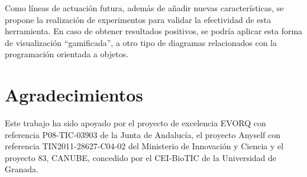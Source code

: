 \documentclass{llncs}
\begin{document}
Como líneas de actuación futura, además de añadir nuevas características, se propone la realización de experimentos para validar la efectividad de esta herramienta. En caso de obtener resultados positivos, se podría aplicar esta forma de visualización ``gamificada'', a otro tipo de diagramas relacionados con la programación orientada a objetos. 




\section*{Agradecimientos}
Este trabajo ha sido apoyado por el proyecto de excelencia EVORQ con referencia P08-TIC-03903 de la Junta de Andalucía, el proyecto Anyself con referencia TIN2011-28627-C04-02 del Ministerio de Innovación y Ciencia y el proyecto 83, CANUBE, concedido por el CEI-BioTIC de la Universidad de Granada.





\end{document}
